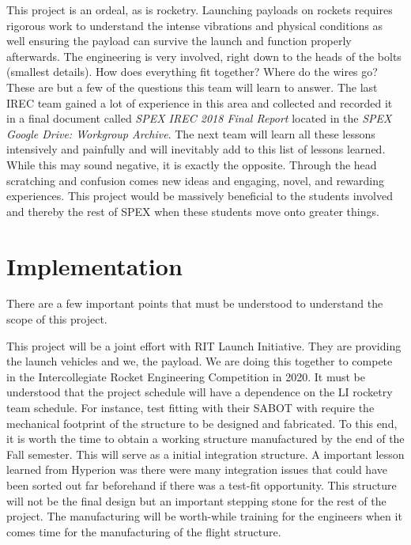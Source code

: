 \documentclass[conference]{IEEEtran} %
\begin{document}
This project is an ordeal, as is rocketry. Launching payloads on rockets requires rigorous work to understand the intense vibrations and physical conditions as well ensuring the 
payload can survive the launch and function properly afterwards. The engineering is very involved, right down to the heads of the bolts (smallest details). How does everything 
fit together? Where do the wires go? These are but a few of the questions this team will learn to answer. The last IREC team gained a lot of experience in this area and collected 
and recorded it in a final document called \textit{SPEX IREC 2018 Final Report} located in the \textit{SPEX Google Drive: Workgroup Archive}. The next team will learn all these lessons intensively and painfully 
and will inevitably add to this list of lessons learned. While this may sound negative, it is exactly the opposite. Through the head scratching and confusion comes new ideas and engaging, 
novel, and rewarding experiences. This project would be massively beneficial to the students involved and thereby the rest of SPEX when these students move onto greater things. 

\section{Implementation}
\label{sec:implementation}

There are a few important points that must be understood to understand the scope of this project. 

This project will be a joint effort with RIT Launch Initiative. They are providing the launch vehicles and we, the payload. We are doing this together to compete in the 
Intercollegiate Rocket Engineering Competition in 2020. It must be understood that the project schedule will have a dependence on the LI rocketry team schedule. For instance, 
test fitting with their SABOT with require the mechanical footprint of the structure to be designed and fabricated. To this end, it is worth the time to obtain a working structure 
manufactured by the end of the Fall semester. This will serve as a initial integration structure. A important lesson learned from Hyperion was there were many integration 
issues that could have been sorted out far beforehand if there was a test-fit opportunity. This structure will not be the final design but an important stepping stone for the 
rest of the project. The manufacturing will be worth-while training for the engineers when it comes time for the manufacturing of the flight structure. 
\end{document}
